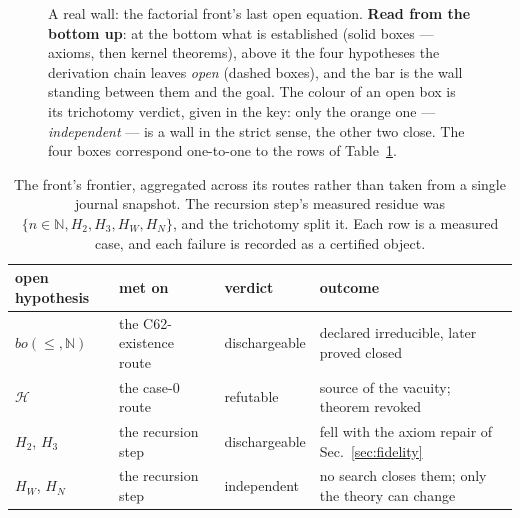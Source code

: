 \documentclass[11pt]{article}
\theoremstyle{remark}\newtheorem{example}{Example}
\begin{document}
\begin{figure}[t]
{}
\caption{A real wall: the factorial front's last open equation. \textbf{Read from the
bottom up}: at the bottom what is established (solid boxes --- axioms, then kernel
theorems), above it the four hypotheses the derivation chain leaves \emph{open} (dashed
boxes), and the bar is the wall standing between them and the goal. The colour of an
open box is its trichotomy verdict, given in the key: only the orange one ---
\emph{independent} --- is a wall in the strict sense, the other two close. The four boxes
correspond one-to-one to the rows of Table~\ref{tab:frontier}.}
\label{fig:wall}
\end{figure}

\begin{table}[t]\centering\footnotesize
\begin{tabular}{llll}
\toprule
open hypothesis & met on & verdict & outcome \\
\midrule
$bo(\le,\mathbb{N})$ & the C62-existence route
  & \textcolor{green!50!black}{dischargeable}
  & declared irreducible, later proved closed \\
$\mathcal{H}$ & the case-$0$ route
  & \textcolor{red!70!black}{refutable}
  & source of the vacuity; theorem revoked \\
$H_2$, $H_3$ & the recursion step
  & \textcolor{green!50!black}{dischargeable}
  & fell with the axiom repair of Sec.~\ref{sec:fidelity} \\
$H_W$, $H_N$ & the recursion step
  & \textcolor{orange!85!black}{independent}
  & no search closes them; only the theory can change \\
\bottomrule
\end{tabular}
\caption{The front's frontier, aggregated across its routes rather than taken from
a single journal snapshot. The recursion step's measured residue was
$\{n{\in}\mathbb{N}, H_2, H_3, H_W, H_N\}$, and the trichotomy split it. Each row is
a measured case, and each failure is recorded as a certified object.}
\label{tab:frontier}
\end{table}
\end{document}
